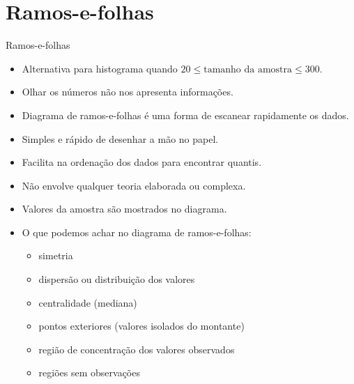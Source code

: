\documentclass[
  10pt,
  ignorenonframetext,
]{beamer}
\providecommand{\tightlist}{%
  \setlength{\itemsep}{0pt}\setlength{\parskip}{0pt}}\usepackage{longtable,booktabs,array}
\begin{document}
\hypertarget{ramos-e-folhas}{%
\section{Ramos-e-folhas}\label{ramos-e-folhas}}

\begin{frame}{Ramos-e-folhas}
\protect\hypertarget{ramos-e-folhas-1}{}
\begin{itemize}
\tightlist
\item
  Alternativa para histograma quando
  \(20 \leq \text{tamanho da amostra} \leq 300\).
\item
  Olhar os números não nos apresenta informações.
\item
  Diagrama de ramos-e-folhas é uma forma de escanear rapidamente os
  dados.
\item
  Simples e rápido de desenhar a mão no papel.
\item
  Facilita na ordenação dos dados para encontrar quantis.
\item
  Não envolve qualquer teoria elaborada ou complexa.
\item
  Valores da amostra são mostrados no diagrama.
\item
  O que podemos achar no diagrama de ramos-e-folhas:

  \begin{itemize}
  \tightlist
  \item
    simetria
  \item
    dispersão ou distribuição dos valores
  \item
    centralidade (mediana)
  \item
    pontos exteriores (valores isolados do montante)
  \item
    região de concentração dos valores observados
  \item
    regiões sem observações
  \end{itemize}
\end{itemize}
\end{frame}
\end{document}
